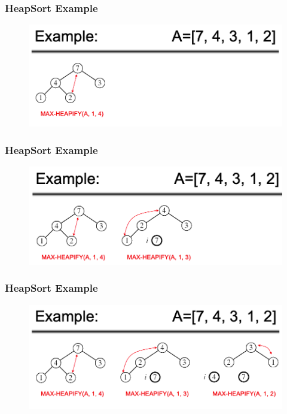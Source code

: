 \documentclass[11pt]{beamer}
\begin{document}
\begin{frame}
	\frametitle	{HeapSort Example} 
	\begin{figure}
		\centering
		\includegraphics[width=1\linewidth]{"Screenshot 2020-12-23 at 9.42.11 PM"}
		\label{fig:screenshot-2020-12-23-at-9}
	\end{figure}
	
\end{frame}
\begin{frame}
	\frametitle	{HeapSort Example} 
	\begin{figure}
		\centering
		\includegraphics[width=1\linewidth]{"Screenshot 2020-12-23 at 9.42.18 PM"}
		\label{fig:screenshot-2020-12-23-at-9}
	\end{figure}
	
\end{frame}
\begin{frame}
	\frametitle	{HeapSort Example} 
	\begin{figure}
		\centering
		\includegraphics[width=1\linewidth]{"Screenshot 2020-12-23 at 9.42.25 PM"}
		\label{fig:screenshot-2020-12-23-at-9}
	\end{figure}
	
\end{frame}
\end{document}
